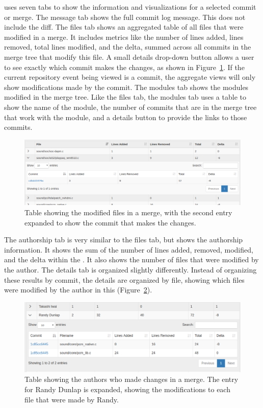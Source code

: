 \tool uses seven tabs to show the information and visualizations for a
selected commit or merge. The message tab shows the full commit log
message. This does not include the diff. The files tab shows an
aggregated table of all files that were modified in a merge. It includes
metrics like the number of lines added, lines removed, total lines
modified, and the delta, summed across all commits in the merge tree
that modify this file. A small details drop-down button allows a user to
see exactly which commit makes the changes, as shown in
Figure~\ref{fig:linvis_files}. If the current repository event being
viewed is a commit, the aggregate views will only show modifications
made by the commit. The modules tab shows the modules modified in the
merge tree. Like the files tab, the modules tab uses a table to show the
name of the module, the number of commits that are in the merge tree
that work with the module, and a details button to provide the links to
those commits.

\begin{figure}[htpb]
  \centering
  \includegraphics[width=1.0\linewidth]{figures/linvis/linvis_files.png}
  \caption{Table showing the modified files in a merge, with the second
  entry expanded to show the commit that makes the changes.}
  \label{fig:linvis_files}
\end{figure}

The authorship tab is very similar to the files tab, but shows the
authorship information. It shows the sum of the number of lines added,
removed, modified, and the delta within the \mt. It also shows
the number of files that were modified by the author. The details tab is
organized slightly differently. Instead of organizing these results by
commit, the details are organized by file, showing which files were
modified by the author in this \mt (Figure~\ref{fig:linvis_authors}).

\begin{figure}[htpb]
  \centering
  \includegraphics[width=1.0\linewidth]{figures/linvis/linvis_authors.png}
  \caption{Table showing the authors who made changes in a merge. The
    entry for Randy Dunlap is expanded, showing the modifications to
    each file that were made by Randy.}
  \label{fig:linvis_authors}
\end{figure}

